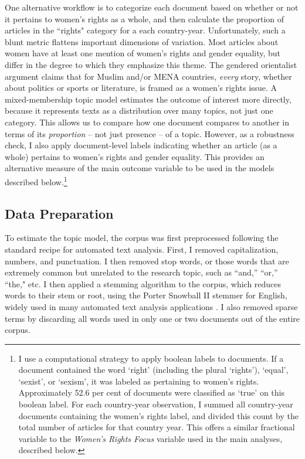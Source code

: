 \documentclass[11pt, oneside]{article}
\begin{document}
One alternative workflow is to categorize each document based on whether or not it pertains to women's rights as a whole, and then calculate the proportion of articles in the ``rights" category for a each country-year. Unfortunately, such a blunt metric flattens important dimensions of variation. Most articles about women have at least one mention of women's rights and gender equality, but differ in the degree to which they emphasize this theme. The gendered orientalist argument claims that for Muslim and/or MENA countries, \emph{every} story, whether about politics or sports or literature, is framed as a women's rights issue. A mixed-membership topic model estimates the outcome of interest more directly, because it represents texts as a distribution over many topics, not just one category. This allows us to compare how one document compares to another in terms of its \emph{proportion} -- not just presence -- of a topic. However, as a robustness check, I also apply document-level labels indicating whether an article (as a whole) pertains to women's rights and gender equality. This provides an alternative measure of the main outcome variable to be used in the models described below.\footnote{I use a computational strategy to apply boolean labels to documents. If a document contained the word `right' (including the plural `rights'), `equal', `sexist', or `sexism', it was labeled as pertaining to women's rights. Approximately 52.6 per cent of documents were classified as `true' on this boolean label. For each country-year observation, I summed all country-year documents containing the women's rights label, and divided this count by the total number of articles for that country year. This offers a similar fractional variable to the \emph{Women's Rights Focus} variable used in the main analyses, described below.}


\subsection{Data Preparation}

To estimate the topic model, the corpus was first preprocessed following the standard recipe for automated text analysis. First, I removed capitalization, numbers, and punctuation. I then removed stop words, or those words that are extremely common but unrelated to the research topic, such as ``and,'' ``or,'' ``the," etc.  I then applied a stemming algorithm to the corpus, which reduces words to their stem or root, using the Porter Snowball II stemmer for English, widely used in many automated text analysis applications \cite{porter2001,willett2006porter}. I also removed sparse terms by discarding all words used in only one or two documents out of the entire corpus. 
\end{document}
